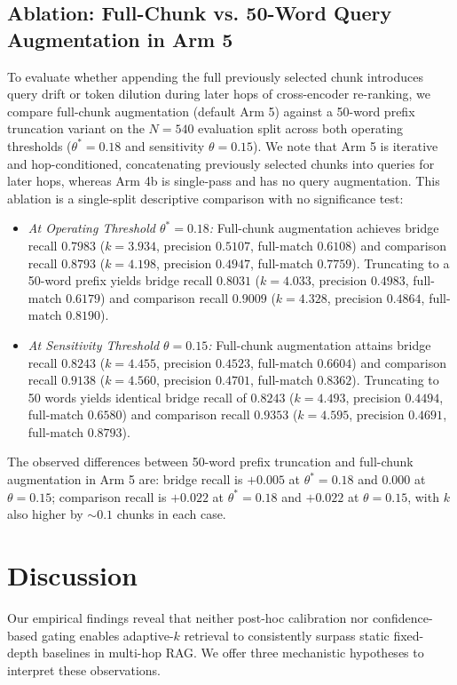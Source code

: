 \documentclass{article}
\begin{document}
\subsection{Ablation: Full-Chunk vs. 50-Word Query Augmentation in Arm 5}
\label{sec:results-ablation}
To evaluate whether appending the full previously selected chunk introduces query drift or token dilution during later hops of cross-encoder re-ranking, we compare full-chunk augmentation (default Arm 5) against a 50-word prefix truncation variant on the $N=540$ evaluation split across both operating thresholds ($\theta^*=0.18$ and sensitivity $\theta=0.15$). We note that Arm 5 is iterative and hop-conditioned, concatenating previously selected chunks into queries for later hops, whereas Arm 4b is single-pass and has no query augmentation. This ablation is a single-split descriptive comparison with no significance test:
\begin{itemize}
    \item \textit{At Operating Threshold $\theta^*=0.18$:} Full-chunk augmentation achieves bridge recall $0.7983$ ($k=3.934$, precision $0.5107$, full-match $0.6108$) and comparison recall $0.8793$ ($k=4.198$, precision $0.4947$, full-match $0.7759$). Truncating to a 50-word prefix yields bridge recall $0.8031$ ($k=4.033$, precision $0.4983$, full-match $0.6179$) and comparison recall $0.9009$ ($k=4.328$, precision $0.4864$, full-match $0.8190$).
    \item \textit{At Sensitivity Threshold $\theta=0.15$:} Full-chunk augmentation attains bridge recall $0.8243$ ($k=4.455$, precision $0.4523$, full-match $0.6604$) and comparison recall $0.9138$ ($k=4.560$, precision $0.4701$, full-match $0.8362$). Truncating to 50 words yields identical bridge recall of $0.8243$ ($k=4.493$, precision $0.4494$, full-match $0.6580$) and comparison recall $0.9353$ ($k=4.595$, precision $0.4691$, full-match $0.8793$).
\end{itemize}
The observed differences between 50-word prefix truncation and full-chunk augmentation in Arm 5 are: bridge recall is $+0.005$ at $\theta^*=0.18$ and $0.000$ at $\theta=0.15$; comparison recall is $+0.022$ at $\theta^*=0.18$ and $+0.022$ at $\theta=0.15$, with $k$ also higher by $\sim 0.1$ chunks in each case.

\enlargethispage{4\baselineskip}
\section{Discussion}
\label{sec:discussion}
Our empirical findings reveal that neither post-hoc calibration nor confidence-based gating enables adaptive-$k$ retrieval to consistently surpass static fixed-depth baselines in multi-hop RAG. We offer three mechanistic hypotheses to interpret these observations.
\end{document}
